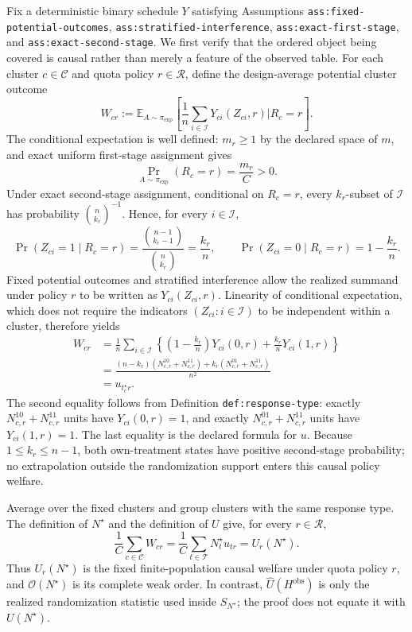 Fix a deterministic binary schedule \(Y\) satisfying Assumptions \texttt{ass:fixed-potential-outcomes}, \texttt{ass:stratified-interference}, \texttt{ass:exact-first-stage}, and \texttt{ass:exact-second-stage}.  We first verify that the ordered object being covered is causal rather than merely a feature of the observed table.  For each cluster \(c\in\mathcal C\) and quota policy \(r\in\mathcal R\), define the design-average potential cluster outcome
\[
 W_{cr}:=
 \mathbb E_{A\sim\pi_{\exp}}\!\left[
   \frac{1}{n}\sum_{i\in\mathcal I}Y_{ci}(Z_{ci},r)
   \mathrel{\Big|} R_c=r
 \right].
\]
The conditional expectation is well defined: \(m_r\geq 1\) by the declared space of \(m\), and exact uniform first-stage assignment gives
\[
 \Pr_{A\sim\pi_{\exp}}(R_c=r)=\frac{m_r}{C}>0.
\]
Under exact second-stage assignment, conditional on \(R_c=r\), every \(k_r\)-subset of \(\mathcal I\) has probability \(\binom n{k_r}^{-1}\).  Hence, for every \(i\in\mathcal I\),
\[
 \Pr(Z_{ci}=1\mid R_c=r)
 =\frac{\binom{n-1}{k_r-1}}{\binom n{k_r}}
 =\frac{k_r}{n},
 \qquad
 \Pr(Z_{ci}=0\mid R_c=r)=1-\frac{k_r}{n}.
\]
Fixed potential outcomes and stratified interference allow the realized summand under policy \(r\) to be written as \(Y_{ci}(Z_{ci},r)\).  Linearity of conditional expectation, which does not require the indicators \((Z_{ci}:i\in\mathcal I)\) to be independent within a cluster, therefore yields
\[
\begin{aligned}
 W_{cr}
 &=\frac{1}{n}\sum_{i\in\mathcal I}
   \left\{
    \left(1-\frac{k_r}{n}\right)Y_{ci}(0,r)
    +\frac{k_r}{n}Y_{ci}(1,r)
   \right\}\\
 &=\frac{(n-k_r)(N_{c,r}^{10}+N_{c,r}^{11})
          +k_r(N_{c,r}^{01}+N_{c,r}^{11})}{n^2}\\
 &=u_{t_c^\star r}.
\end{aligned}
\]
The second equality follows from Definition \texttt{def:response-type}: exactly \(N_{c,r}^{10}+N_{c,r}^{11}\) units have \(Y_{ci}(0,r)=1\), and exactly \(N_{c,r}^{01}+N_{c,r}^{11}\) units have \(Y_{ci}(1,r)=1\).  The last equality is the declared formula for \(u\).  Because \(1\leq k_r\leq n-1\), both own-treatment states have positive second-stage probability; no extrapolation outside the randomization support enters this causal policy welfare.

Average over the fixed clusters and group clusters with the same response type.  The definition of \(N^\star\) and the definition of \(U\) give, for every \(r\in\mathcal R\),
\[
 \frac{1}{C}\sum_{c\in\mathcal C}W_{cr}
 =\frac{1}{C}\sum_{t\in\mathcal T}N_t^\star u_{tr}
 =U_r(N^\star).
\]
Thus \(U_r(N^\star)\) is the fixed finite-population causal welfare under quota policy \(r\), and \(\mathcal O(N^\star)\) is its complete weak order.  In contrast, \(\widehat U(H^{\mathrm{obs}})\) is only the realized randomization statistic used inside \(S_{N^\star}\); the proof does not equate it with \(U(N^\star)\).

